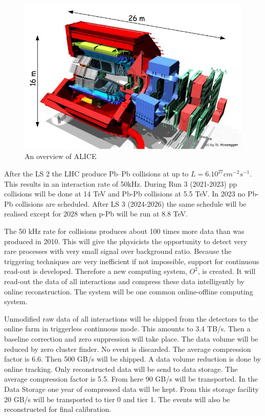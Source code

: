 \begin{figure}[h]
  \begin{center}
    \includegraphics[scale=0.4]{./images/alice_upgrade.jpg}
    \caption{An overview of ALICE}
    \label{fig:overview}
  \end{center}
\end{figure}
After the LS 2 the LHC produce Pb–Pb collisions at up to $L = 6.10^{27} cm^{-2} s^{-1}$. This results in an interaction rate of 50kHz. During Run 3 (2021-2023) pp collisions will be done at 14 TeV and Pb-Pb collisions at 5.5 TeV. In 2023 no Pb-Pb collisions are scheduled. After LS 3 (2024-2026) the same schedule will be realised except for 2028 when p-Pb will be run at 8.8 TeV.

The 50 kHz rate for collisions produces about 100 times more data than was produced in 2010. This will give the physicists the opportunity to detect very rare processes with very small signal over background ratio. Because the triggering techniques are very inefficient if not impossible, support for continuous read-out is developed. Therefore a new computing system, $O^2$, is created. It will read-out the data of all interactions and compress these data intelligently by online reconstruction. The system will be one common online-offline computing system.

Unmodified raw data of all interactions will be shipped from the detectors to the online farm in triggerless continuous mode. This  amounts to 3.4 TB/s. Then a baseline correction and zero suppression will take place. The data volume will be reduced by zero cluster finder. No event is discarded. The average compression factor is 6.6. Then 500 GB/s will be shipped. A data volume reduction is done by online tracking. Only reconstructed data will be send to data storage. The average compression factor is 5.5. From here 90 GB/s will be transported. In the Data Storage one year of compressed data will be kept. From this storage facility 20 GB/s will be transported to tier 0 and tier 1. The events will also be reconstructed for final calibration.

